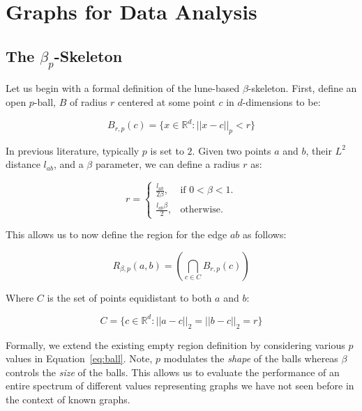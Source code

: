 
\chapter{Graphs for Data Analysis}
\label{ch:graphs}


\section{The $\beta_p$-Skeleton}
\label{sec:bpskeleton}
Let us begin with a formal definition of the lune-based $\beta$-skeleton.
%
First, define an open $p$-ball, $B$ of radius $r$ centered at some point $c$ in $d$-dimensions to be:

\begin{equation}
\label{eq:ball}
    B_{r,p}(c) = \{x \in \mathbb{R}^d : || x  - c ||_p < r\}
\end{equation}

In previous literature, typically $p$ is set to $2$.
%
Given two points $a$ and $b$, their $L^2$ distance $l_{ab}$, and a $\beta$ parameter, we can define a radius $r$ as:

\begin{equation}
    \label{eq:beta_radius}
    r =
    \begin{cases}
        \frac{l_{ab}}{2\beta}, & \text{if $0 < \beta < 1$}.\\
        \frac{l_{ab}\beta}{2}, & \text{otherwise}.
    \end{cases}
\end{equation}

This allows us to now define the region for the edge $ab$ as follows:

\begin{equation}
    R_{\beta,p}(a,b) = \left(\bigcap_{c \in C} B_{r,p}(c)\right)
\end{equation}

Where $C$ is the set of points equidistant to both $a$ and $b$:

\begin{equation}
    C = \{c \in \mathbb{R}^d: ||a -c||_2 = ||b - c||_2 = r\}
\end{equation}

Formally, we extend the existing empty region definition by considering various $p$ values in Equation~\ref{eq:ball}.
%
Note, $p$ modulates the \emph{shape} of the balls whereas $\beta$ controls the \emph{size} of the balls.
%
This allows us to evaluate the performance of an entire spectrum of different values representing graphs we have not seen before in the context of known graphs.

